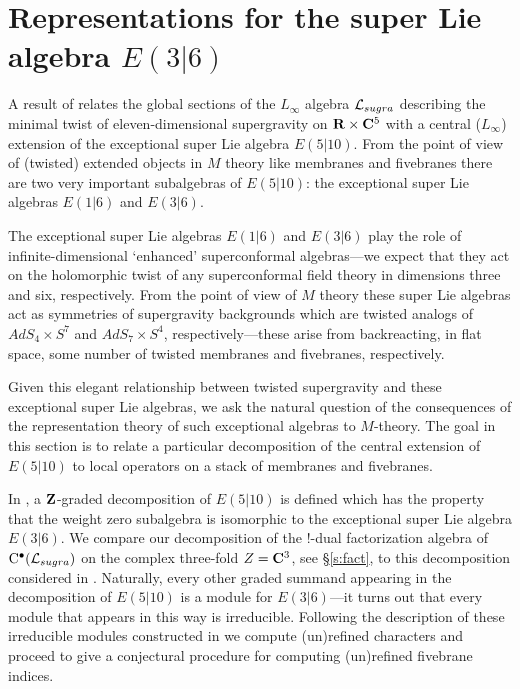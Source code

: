 %
%
%

\section{Representations for the super Lie algebra $E(3|6)$}
\label{s:kr}

A result of \cite{RSW} relates the global sections of the $L_\infty$ algebra $\mathcal L_{sugra}$ describing the minimal twist of eleven-dimensional supergravity on $\mathbf{R} \times \mathbf{C}^5$ with a central ($L_\infty$) extension of the exceptional super Lie algebra $E(5|10)$.
From the point of view of (twisted) extended objects in $M$ theory like membranes and fivebranes there are two very important subalgebras of $E(5|10)$: the exceptional super Lie algebras $E(1|6)$ and $E(3|6)$. 

The exceptional super Lie algebras $E(1|6)$ and $E(3|6)$ play the role of infinite-dimensional `enhanced' superconformal algebras---we expect that they act on the holomorphic twist of any superconformal field theory in dimensions three and six, respectively.
From the point of view of $M$ theory these super Lie algebras act as symmetries of supergravity backgrounds which are twisted analogs of $AdS_4 \times S^7$ and $AdS_7 \times S^4$, respectively---these arise from backreacting, in flat space, some number of twisted membranes and fivebranes, respectively. 

Given this elegant relationship between twisted supergravity and these exceptional super Lie algebras, we ask the natural question of the consequences of the representation theory of such exceptional algebras to $M$-theory. 
The goal in this section is to relate a particular decomposition of the central extension of $E(5|10)$ to local operators on a stack of membranes and fivebranes.

In \cite{KR2}, a $\mathbf{Z}$-graded decomposition of $E(5|10)$ is defined which has the property that the weight zero subalgebra is isomorphic to the exceptional super Lie algebra $E(3|6)$.
We compare our decomposition of the $!$-dual factorization algebra of ${\rm C}^\bullet(\mathcal L_{sugra})$ on the complex three-fold $Z = \mathbf{C}^3$, see \S \ref{s:fact}, to this decomposition considered in \cite{KR2}.
Naturally, every other graded summand appearing in the decomposition of $E(5|10)$ is a module for $E(3|6)$---it turns out that every module that appears in this way is irreducible.
Following the description of these irreducible modules constructed in \cite{KR1,KR2} we compute (un)refined characters and proceed to give a conjectural procedure for computing (un)refined fivebrane indices.

